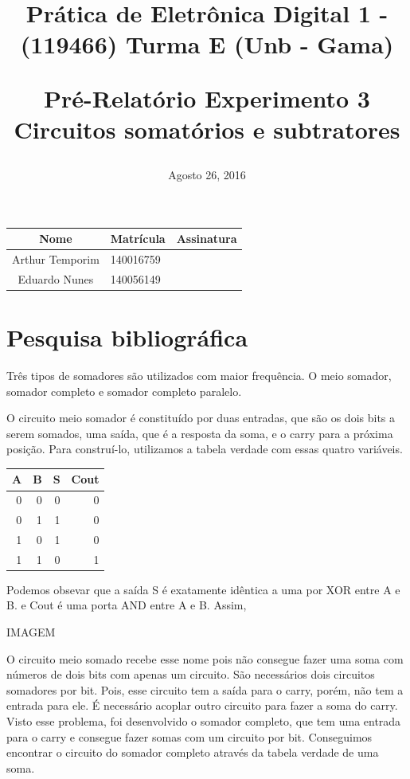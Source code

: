 \documentclass[12pts]{article}
\title{
	Prática de Eletrônica Digital 1 - (119466)
	\singlespacing
		Turma E (Unb - Gama)
	\singlespacing
	\begin{midpage}
	\begin {large}
		Pré-Relatório Experimento 3
		\singlespace
		Circuitos somatórios e subtratores
	\end {large}
	\end{midpage}
}
\date{Agosto 26, 2016}
\begin{document}
\maketitle	
\begin{center}

\begin{tabular}{|c|l|r|}
\hline
Nome & Matrícula & Assinatura\\
\hline
Arthur Temporim & 140016759 & \\
\hline	
Eduardo Nunes & 140056149 & \\
\hline	
\end{tabular}

\end{center}

\pagebreak

\section{Pesquisa bibliográfica}

Três tipos de somadores são utilizados com maior frequência. O meio somador, somador completo e somador completo paralelo.
	
O circuito meio somador é constituído por duas entradas, que são os dois bits a serem somados, uma saída, que é a resposta da soma, e o carry para a próxima posição. Para construí-lo, utilizamos a tabela verdade com essas quatro variáveis. 

\begin{center}
	\begin{tabular}{|r|r|r|r|}
		\hline
		A & B & S & Cout \\
		\hline
		0 & 0 & 0 & 0 \\				
		\hline
		0 & 1 & 1 & 0 \\
		\hline
		1 & 0 & 1 & 0 \\
		\hline
		1 & 1 & 0 & 1 \\
		\hline
	\end{tabular}
\end{center}

Podemos obsevar que a saída S é exatamente idêntica a uma por XOR entre A e B. e Cout é uma porta AND entre A e B. Assim, 

IMAGEM 

O circuito meio somado recebe esse nome pois não consegue fazer uma soma com números de dois bits com apenas um circuito. São necessários dois circuitos somadores por bit.  Pois, esse circuito tem a saída para o carry, porém, não tem a entrada para ele. É necessário acoplar outro circuito para fazer a soma do carry. Visto esse problema, foi desenvolvido o somador completo, que tem uma entrada para o carry e consegue fazer somas com um circuito por bit. Conseguimos encontrar o circuito do somador completo através da tabela verdade de uma soma.
\end{document}
